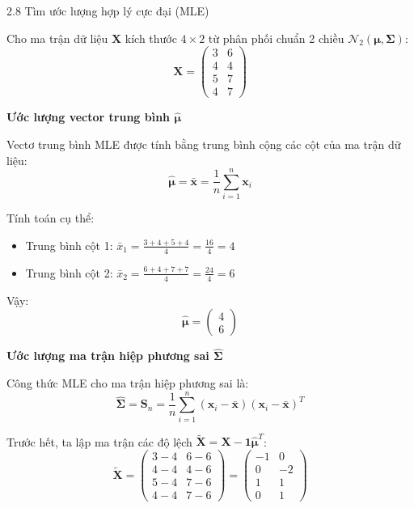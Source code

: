 \begin{question}{2.8}
Tìm ước lượng hợp lý cực đại (MLE)

Cho ma trận dữ liệu $\mathbf{X}$ kích thước $4 \times 2$ từ phân phối chuẩn 2 chiều $\mathcal{N}_2(\boldsymbol{\mu}, \boldsymbol{\Sigma})$:
$$ \mathbf{X} = \begin{pmatrix} 3 & 6 \\ 4 & 4 \\ 5 & 7 \\ 4 & 7 \end{pmatrix} $$

\begin{subquestion}
\begin{answer}

\textbf{Ước lượng vector trung bình $\hat{\boldsymbol{\mu}}$}

Vectơ trung bình MLE được tính bằng trung bình cộng các cột của ma trận dữ liệu:
$$ \hat{\boldsymbol{\mu}} = \bar{\mathbf{x}} = \frac{1}{n} \sum_{i=1}^{n} \mathbf{x}_i $$

Tính toán cụ thể:
\begin{itemize}
    \item Trung bình cột 1: $\bar{x}_1 = \frac{3 + 4 + 5 + 4}{4} = \frac{16}{4} = 4$
    \item Trung bình cột 2: $\bar{x}_2 = \frac{6 + 4 + 7 + 7}{4} = \frac{24}{4} = 6$
\end{itemize}

Vậy:
$$ \hat{\boldsymbol{\mu}} = \begin{pmatrix} 4 \\ 6 \end{pmatrix} $$

\end{answer}
\end{subquestion}

\begin{subquestion}
\begin{answer}

\textbf{Ước lượng ma trận hiệp phương sai $\hat{\boldsymbol{\Sigma}}$}

Công thức MLE cho ma trận hiệp phương sai là:
$$ \hat{\boldsymbol{\Sigma}} = \mathbf{S}_n = \frac{1}{n} \sum_{i=1}^{n} (\mathbf{x}_i - \bar{\mathbf{x}})(\mathbf{x}_i - \bar{\mathbf{x}})^T $$

Trước hết, ta lập ma trận các độ lệch $\tilde{\mathbf{X}} = \mathbf{X} - \mathbf{1}\hat{\boldsymbol{\mu}}^T$:
$$ \tilde{\mathbf{X}} = \begin{pmatrix} 3-4 & 6-6 \\ 4-4 & 4-6 \\ 5-4 & 7-6 \\ 4-4 & 7-6 \end{pmatrix} = \begin{pmatrix} -1 & 0 \\ 0 & -2 \\ 1 & 1 \\ 0 & 1 \end{pmatrix} $$


\end{answer}
\end{subquestion}
\end{question}
